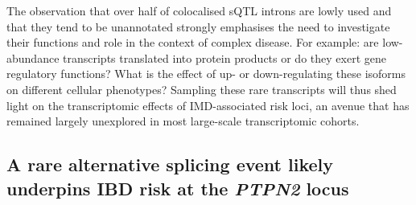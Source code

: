 The observation that over half of colocalised sQTL introns are lowly used and that they tend to be unannotated strongly emphasises the need to investigate their functions and role in the context of complex disease. For example: are low-abundance transcripts translated into protein products or do they exert gene regulatory functions? What is the effect of up- or down-regulating these isoforms on different cellular phenotypes? Sampling these rare transcripts will thus shed light on the transcriptomic effects of IMD-associated risk loci, an avenue that has remained largely unexplored in most large-scale transcriptomic cohorts. \\
\subsection{A rare alternative splicing event likely underpins IBD risk at the \textit{PTPN2} locus}

